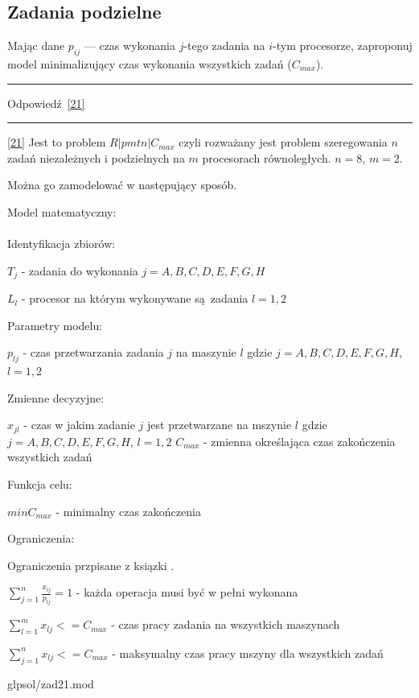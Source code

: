 \documentclass{article}
\begin{document}
\subsection{Zadania podzielne \label{21}}
Mając dane \(p_{ij}\) — czas wykonania \(j\)-tego zadania na \(i\)-tym procesorze,
zaproponuj model minimalizujący czas wykonania wszystkich zadań (\(C_{max}\)).

\par\noindent\rule{\textwidth}{0.4pt}
Odpowiedź \ref{21}
\par\noindent\rule{\textwidth}{0.4pt}

\ref{21} Jest to problem $R|pmtn|C_{max}$ czyli rozważany jest problem szeregowania $n$ zadań niezależnych i podzielnych na $m$ procesorach równoległych. $n = 8$, $m = 2$.

Można go zamodelować w następujący sposób.

\noindent Model matematyczny: \\\\

\noindent Identyfikacja zbiorów:

$T_j$ - zadania do wykonania $j = {A,B,C,D,E,F,G,H}$

$L_{l}$ - procesor na którym wykonywane są zadania $l = {1,2}$

\noindent Parametry modelu:

$p_{lj}$ - czas przetwarzania zadania $j$ na maszynie $l$ gdzie $j = {A,B,C,D,E,F,G,H}$, $l = {1,2}$

\noindent Zmienne decyzyjne:

$x_{jl}$ - czas w jakim zadanie $j$ jest przetwarzane na mszynie $l$ gdzie $j = {A,B,C,D,E,F,G,H}$, $l = {1,2}$ 
$C_{max}$ - zmienna określająca czas zakończenia wszystkich zadań

\noindent Funkcja celu:

$min C_{max}$ - minimalny czas zakończenia

\noindent Ograniczenia:

Ograniczenia przpisane z ksiązki \cite{scheduling}.

$\sum^{n}_{j = 1} \frac{x_{lj}}{p_{lj}} = 1$ - każda operacja musi być w pełni wykonana

$\sum^{m}_{l = 1} x_{lj} <= C_{max}$  - czas pracy zadania na wszystkich maszynach

$\sum^{n}_{j = 1} x_{lj} <= C_{max}$  - maksymalny czas pracy mszyny dla wszystkich zadań


{glpsol/zad21.mod}
\end{document}
